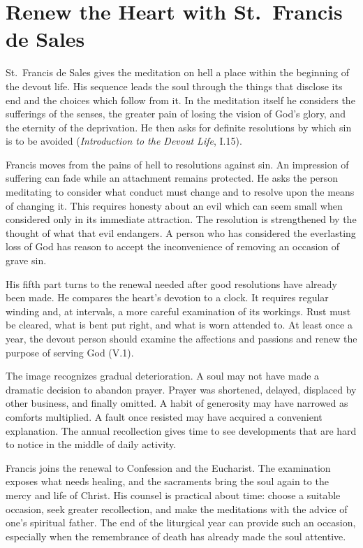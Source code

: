 \section{Renew the Heart with St.~Francis de Sales}

St.~Francis de Sales gives the meditation on hell a place within the beginning of the devout life. His sequence leads the soul through the things that disclose its end and the choices which follow from it. In the meditation itself he considers the sufferings of the senses, the greater pain of losing the vision of God's glory, and the eternity of the deprivation. He then asks for definite resolutions by which sin is to be avoided (\emph{Introduction to the Devout Life}, I.15).

Francis moves from the pains of hell to resolutions against sin. An impression of suffering can fade while an attachment remains protected. He asks the person meditating to consider what conduct must change and to resolve upon the means of changing it. This requires honesty about an evil which can seem small when considered only in its immediate attraction. The resolution is strengthened by the thought of what that evil endangers. A person who has considered the everlasting loss of God has reason to accept the inconvenience of removing an occasion of grave sin.

His fifth part turns to the renewal needed after good resolutions have already been made. He compares the heart's devotion to a clock. It requires regular winding and, at intervals, a more careful examination of its workings. Rust must be cleared, what is bent put right, and what is worn attended to. At least once a year, the devout person should examine the affections and passions and renew the purpose of serving God (V.1).

The image recognizes gradual deterioration. A soul may not have made a dramatic decision to abandon prayer. Prayer was shortened, delayed, displaced by other business, and finally omitted. A habit of generosity may have narrowed as comforts multiplied. A fault once resisted may have acquired a convenient explanation. The annual recollection gives time to see developments that are hard to notice in the middle of daily activity.

Francis joins the renewal to Confession and the Eucharist. The examination exposes what needs healing, and the sacraments bring the soul again to the mercy and life of Christ. His counsel is practical about time: choose a suitable occasion, seek greater recollection, and make the meditations with the advice of one's spiritual father. The end of the liturgical year can provide such an occasion, especially when the remembrance of death has already made the soul attentive.


